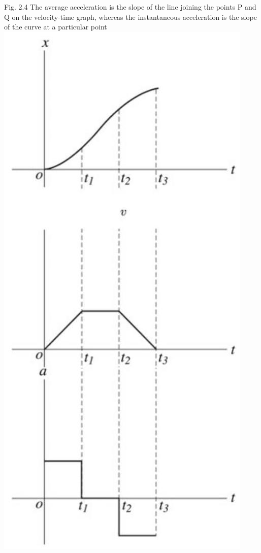 \documentclass[10pt]{article}
\begin{document}
Fig. 2.4 The average acceleration is the slope of the line joining the points P and Q on the velocity-time graph, whereas the instantaneous acceleration is the slope of the curve at a particular point\\
\includegraphics[max width=\textwidth, center]{2024_09_13_db1f357d2aad0a03eb2eg-029(2)}
\end{document}
